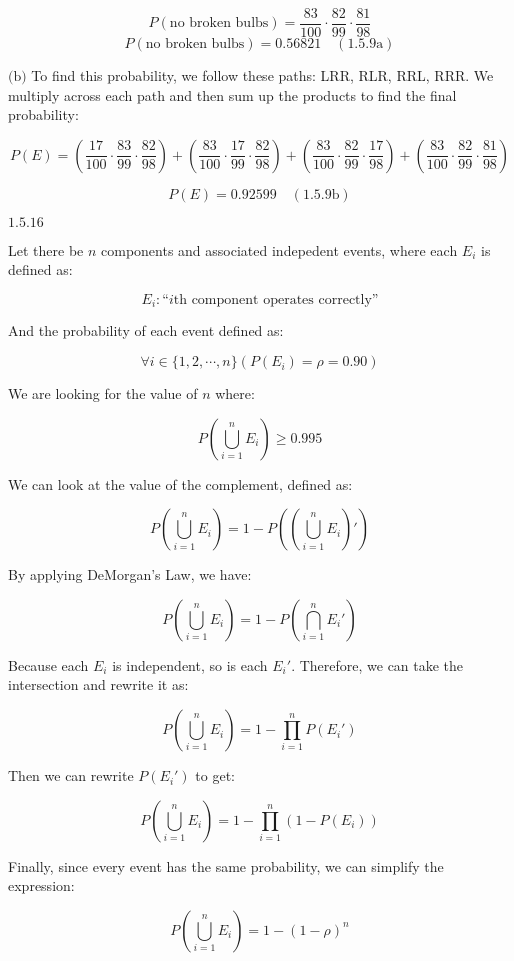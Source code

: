 \documentclass{article}
\newcommand{\problem}[2]{$\boxed{\text{#1.#2}}$}
\newcommand{\subproblem}[3]{$\boxed{\text{(#3)}}$}
\newcommand{\subsolution}[4]{\boxed{#4\quad(\text{#1.#2#3})}}
\begin{document}
\[
P(\text{no broken bulbs})=\dfrac{83}{100}\cdot\dfrac{82}{99}\cdot\dfrac{81}{98}
\] \[
\subsolution{1.5}{9}{a}{P(\text{no broken bulbs})=0.56821}
\]

\subproblem{1.5}{9}{b} To find this probability, we follow these
paths: LRR, RLR, RRL, RRR. We multiply across each path and then sum
up the products to find the final probability:

\[
P(E)=
\left(\dfrac{17}{100}\cdot
\dfrac{83}{99}\cdot
\dfrac{82}{98}\right)
+
\left(\dfrac{83}{100}\cdot
\dfrac{17}{99}\cdot
\dfrac{82}{98}\right)
+
\left(\dfrac{83}{100}\cdot
\dfrac{82}{99}\cdot
\dfrac{17}{98}\right)
+
\left(\dfrac{83}{100}\cdot
\dfrac{82}{99}\cdot
\dfrac{81}{98}\right)
\]

\[
\subsolution{1.5}{9}{b}{P(E)=0.92599}
\]

%
\problem{1.5}{16}

Let there be $n$ components and associated indepedent events, where
each $E_i$ is defined as:

\[
E_i:\text{``$i$th component operates correctly''}
\]

And the probability of each event defined as:

\[
\forall i\in\{1,2,\cdots,n\}(P(E_i)=\rho=0.90)
\]

We are looking for the value of $n$ where:

\[
P\left(\bigcup\limits_{i=1}^n E_i\right)\ge 0.995
\]

We can look at the value of the complement, defined as:

\[
P\left(\bigcup\limits_{i=1}^n E_i\right)=
1 - P\left(\left(\bigcup\limits_{i=1}^nE_i\right)'\right)
\]

By applying DeMorgan's Law, we have:

\[
P\left(\bigcup\limits_{i=1}^n E_i\right)=
1 - P\left(\bigcap\limits_{i=1}^nE_i'\right)
\]

Because each $E_i$ is independent, so is each $E_i'$. Therefore, we
can take the intersection and rewrite it as:

\[
P\left(\bigcup\limits_{i=1}^n E_i\right)=
1 - \prod\limits_{i=1}^nP(E_i')
\]

Then we can rewrite $P(E_i')$ to get:

\[
P\left(\bigcup\limits_{i=1}^n E_i\right)=
1 - \prod\limits_{i=1}^n(1-P(E_i))
\]

Finally, since every event has the same probability, we can simplify
the expression:

\[
P\left(\bigcup\limits_{i=1}^n E_i\right)=
1 - (1-\rho)^n
\]
\end{document}
